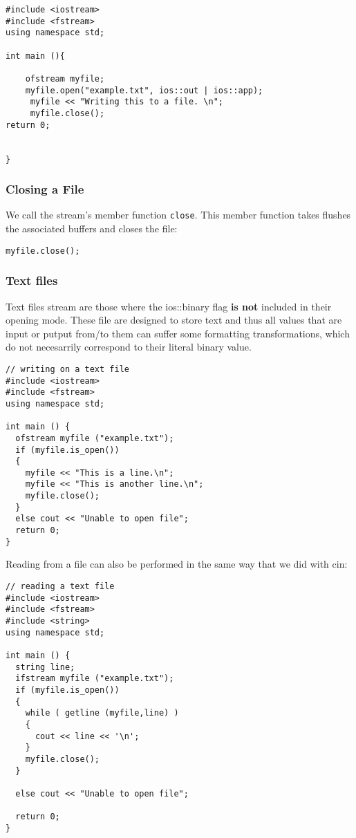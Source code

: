 \begin{verbatim}
#include <iostream>
#include <fstream>
using namespace std; 

int main (){

    ofstream myfile; 
    myfile.open("example.txt", ios::out | ios::app); 
     myfile << "Writing this to a file. \n";      
     myfile.close(); 
return 0; 


}

\end{verbatim}


\subsubsection{Closing a File }

We call the stream's member function \verb|close|. This member function takes flushes the associated buffers and closes the file: 

\begin{verbatim}
myfile.close(); 
\end{verbatim}

\subsubsection{Text files}

Text files stream are those where the ios::binary flag \textbf{is not} included in their opening mode. These file are designed to store text and thus all values that are input or putput from/to them can suffer some formatting transformations, which do not necesarrily correspond to their literal binary value. 


\begin{verbatim}
// writing on a text file
#include <iostream>
#include <fstream>
using namespace std;

int main () {
  ofstream myfile ("example.txt");
  if (myfile.is_open())
  {
    myfile << "This is a line.\n";
    myfile << "This is another line.\n";
    myfile.close();
  }
  else cout << "Unable to open file";
  return 0;
}
\end{verbatim}


Reading from a file can also be performed in the same way that we did with cin:


\begin{verbatim}
// reading a text file
#include <iostream>
#include <fstream>
#include <string>
using namespace std;

int main () {
  string line;
  ifstream myfile ("example.txt");
  if (myfile.is_open())
  {
    while ( getline (myfile,line) )
    {
      cout << line << '\n';
    }
    myfile.close();
  }

  else cout << "Unable to open file"; 

  return 0;
}

\end{verbatim}



